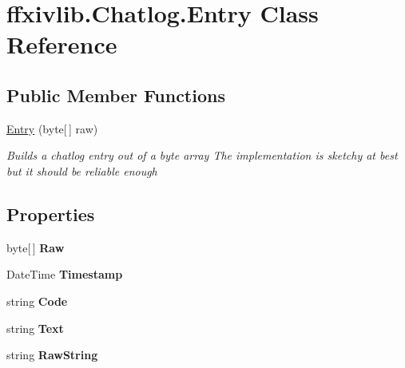 \hypertarget{classffxivlib_1_1_chatlog_1_1_entry}{\section{ffxivlib.\-Chatlog.\-Entry Class Reference}
\label{classffxivlib_1_1_chatlog_1_1_entry}
}
\subsection*{Public Member Functions}
\begin{DoxyCompactItemize}
\item 
\hyperlink{classffxivlib_1_1_chatlog_1_1_entry_a2b14f09a1008f88b04a9176357fee766}{Entry} (byte\mbox{[}$\,$\mbox{]} raw)
\begin{DoxyCompactList}\small\item\em Builds a chatlog entry out of a byte array The implementation is sketchy at best but it should be reliable enough \end{DoxyCompactList}\end{DoxyCompactItemize}
\subsection*{Properties}
\begin{DoxyCompactItemize}
\item 
\hypertarget{classffxivlib_1_1_chatlog_1_1_entry_a6cc202691240a2a2da0a88429f652fba}{byte\mbox{[}$\,$\mbox{]} {\bfseries Raw}}\label{classffxivlib_1_1_chatlog_1_1_entry_a6cc202691240a2a2da0a88429f652fba}

\item 
\hypertarget{classffxivlib_1_1_chatlog_1_1_entry_aa22172956f66973ded0fbf698c3f0198}{Date\-Time {\bfseries Timestamp}}\label{classffxivlib_1_1_chatlog_1_1_entry_aa22172956f66973ded0fbf698c3f0198}

\item 
\hypertarget{classffxivlib_1_1_chatlog_1_1_entry_a52cd6b63b074515a819dcfe7495d7e24}{string {\bfseries Code}}\label{classffxivlib_1_1_chatlog_1_1_entry_a52cd6b63b074515a819dcfe7495d7e24}

\item 
\hypertarget{classffxivlib_1_1_chatlog_1_1_entry_a3e8b65ed295deace9083294a939f6229}{string {\bfseries Text}}\label{classffxivlib_1_1_chatlog_1_1_entry_a3e8b65ed295deace9083294a939f6229}

\item 
\hypertarget{classffxivlib_1_1_chatlog_1_1_entry_a13b55fd15cfc842f47573bca08d22b6e}{string {\bfseries Raw\-String}}\label{classffxivlib_1_1_chatlog_1_1_entry_a13b55fd15cfc842f47573bca08d22b6e}

\end{DoxyCompactItemize}


